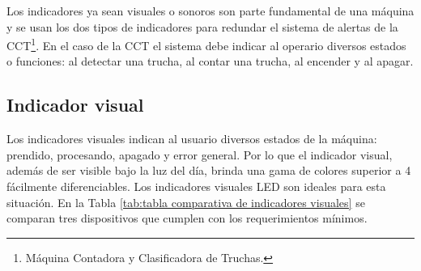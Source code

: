 Los indicadores ya sean visuales o sonoros son parte fundamental de una máquina y se usan los dos tipos de indicadores para redundar el sistema de alertas de la CCT\footnote{Máquina Contadora y Clasificadora de Truchas.}. En el caso de la CCT el sistema debe indicar al operario diversos estados o funciones: al detectar una trucha, al contar una trucha, al encender y al apagar.


\subsection{Indicador visual}

Los indicadores visuales indican al usuario diversos estados de la máquina: prendido, procesando, apagado y error general. Por lo que el indicador visual, además de ser visible bajo la luz del día, brinda una gama de colores superior a 4 fácilmente diferenciables. Los indicadores visuales LED son ideales para esta situación. En la Tabla \ref{tab:tabla comparativa de indicadores visuales} se comparan tres dispositivos que cumplen con los requerimientos mínimos.	

